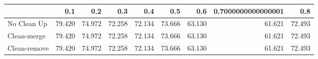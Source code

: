 \begin{tabular}{lrrrrrrrr}
\toprule
{} &    0.1 &    0.2 &    0.3 &    0.4 &    0.5 &    0.6 & 0.7000000000000001 &    0.8 \\
\midrule
No Clean Up  & 79.420 & 74.972 & 72.258 & 72.134 & 73.666 & 63.130 &             61.621 & 72.493 \\
Clean-merge  & 79.420 & 74.972 & 72.258 & 72.134 & 73.666 & 63.130 &             61.621 & 72.493 \\
Clean-remove & 79.420 & 74.972 & 72.258 & 72.134 & 73.666 & 63.130 &             61.621 & 72.493 \\
\bottomrule
\end{tabular}
